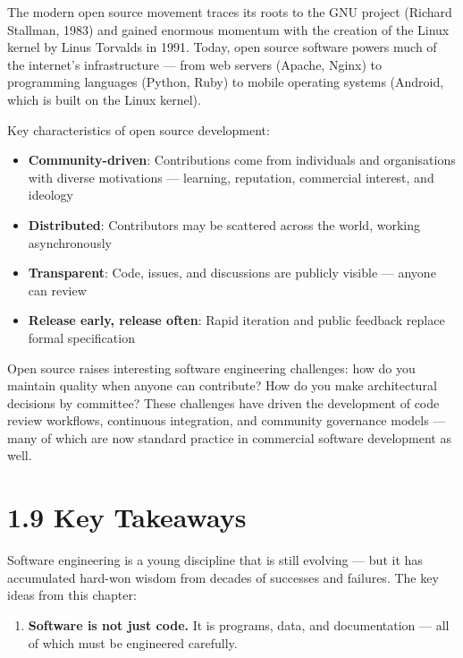 \documentclass[11pt,a4paper]{book}
\begin{document}
The modern open source movement traces its roots to the GNU project (Richard Stallman, 1983) and gained enormous momentum with the creation of the Linux kernel by Linus Torvalds in 1991. Today, open source software powers much of the internet's infrastructure --- from web servers (Apache, Nginx) to programming languages (Python, Ruby) to mobile operating systems (Android, which is built on the Linux kernel).

Key characteristics of open source development:

\begin{itemize}
  \item \textbf{Community-driven}: Contributions come from individuals and organisations with diverse motivations --- learning, reputation, commercial interest, and ideology
  \item \textbf{Distributed}: Contributors may be scattered across the world, working asynchronously
  \item \textbf{Transparent}: Code, issues, and discussions are publicly visible --- anyone can review
  \item \textbf{Release early, release often}: Rapid iteration and public feedback replace formal specification
\end{itemize}

Open source raises interesting software engineering challenges: how do you maintain quality when anyone can contribute? How do you make architectural decisions by committee? These challenges have driven the development of code review workflows, continuous integration, and community governance models --- many of which are now standard practice in commercial software development as well.

\medskip

\section{1.9 Key Takeaways}

Software engineering is a young discipline that is still evolving --- but it has accumulated hard-won wisdom from decades of successes and failures. The key ideas from this chapter:

\begin{enumerate}
  \item \textbf{Software is not just code.} It is programs, data, and documentation --- all of which must be engineered carefully.
\end{enumerate}
\end{document}
